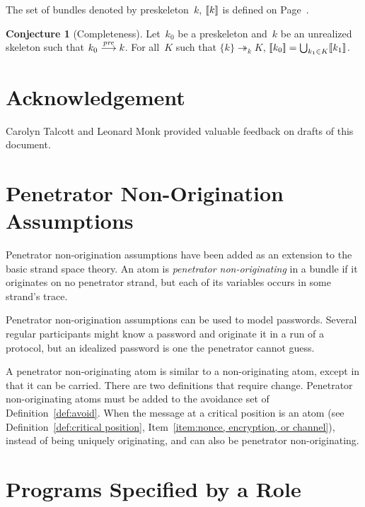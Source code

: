 \documentclass[12pt]{report}
\theoremstyle{definition}
\newtheorem{conj}[thm]{Conjecture}
\begin{document}
The set of bundles denoted by preskeleton~$k$, $[\![k]\!]$ is
defined on Page~\pageref{def:preskeleton denotation}.

\begin{conj}[Completeness]\label{cnj:completeness}
Let~$k_0$ be a preskeleton and~$k$ be an unrealized skeleton such that
$k_0\stackrel{\operatorname{\mathit{pre}}}{\longrightarrow}k$.  For all~$K$ such that $\{k\}\twoheadrightarrow_k
K$, $[\![k_0]\!]=\bigcup_{k_1\in K}[\![k_1]\!]$.
\end{conj}

\chapter*{Acknowledgement}

Carolyn Talcott and Leonard Monk provided valuable feedback on drafts
of this document.

\appendix

\chapter{Penetrator Non-Origination Assumptions}\relax
\label{chp:penetrator non-origination}

Penetrator non-origination assumptions have been added as an extension
to the basic strand space theory.  An atom is \emph{penetrator
  non-originating} in a bundle if it originates on no penetrator
strand, but each of its variables occurs in some strand's trace.

Penetrator non-origination assumptions can be used to model
passwords.  Several regular participants might know a password and
originate it in a run of a protocol, but an idealized password is one
the penetrator cannot guess.

A penetrator non-originating atom is similar to a non-originating
atom, except in that it can be carried.  There are two definitions
that require change.  Penetrator non-originating atoms must be added
to the avoidance set of Definition~\ref{def:avoid}.  When the message
at a critical position is an atom (see Definition~\ref{def:critical
  position}, Item~\ref{item:nonce, encryption, or channel}), instead of being
uniquely originating, and can also be penetrator non-originating.

\chapter{Programs Specified by a Role}\label{chp:traces}
\end{document}
